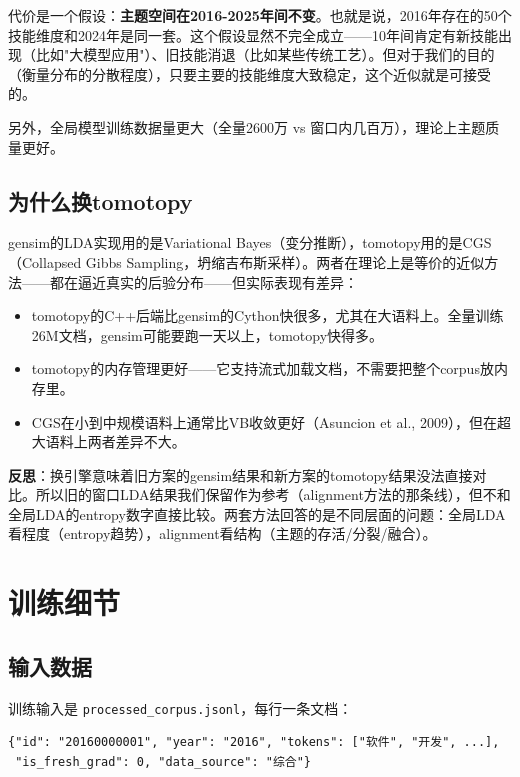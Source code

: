 \documentclass[12pt,a4paper]{ctexart}
\begin{document}
代价是一个假设：\textbf{主题空间在2016-2025年间不变}。也就是说，2016年存在的50个技能维度和2024年是同一套。这个假设显然不完全成立——10年间肯定有新技能出现（比如"大模型应用"）、旧技能消退（比如某些传统工艺）。但对于我们的目的（衡量分布的分散程度），只要主要的技能维度大致稳定，这个近似就是可接受的。

另外，全局模型训练数据量更大（全量2600万 vs 窗口内几百万），理论上主题质量更好。

\subsection{为什么换tomotopy}

gensim的LDA实现用的是Variational Bayes（变分推断），tomotopy用的是CGS（Collapsed Gibbs Sampling，坍缩吉布斯采样）。两者在理论上是等价的近似方法——都在逼近真实的后验分布——但实际表现有差异：

\begin{itemize}
\item tomotopy的C++后端比gensim的Cython快很多，尤其在大语料上。全量训练26M文档，gensim可能要跑一天以上，tomotopy快得多。
\item tomotopy的内存管理更好——它支持流式加载文档，不需要把整个corpus放内存里。
\item CGS在小到中规模语料上通常比VB收敛更好（Asuncion et al., 2009），但在超大语料上两者差异不大。
\end{itemize}

\textbf{反思}：换引擎意味着旧方案的gensim结果和新方案的tomotopy结果没法直接对比。所以旧的窗口LDA结果我们保留作为参考（alignment方法的那条线），但不和全局LDA的entropy数字直接比较。两套方法回答的是不同层面的问题：全局LDA看程度（entropy趋势），alignment看结构（主题的存活/分裂/融合）。


\section{训练细节}
\label{sec:training}

\subsection{输入数据}

训练输入是 \texttt{processed\_corpus.jsonl}，每行一条文档：

\begin{verbatim}
{"id": "20160000001", "year": "2016", "tokens": ["软件", "开发", ...],
 "is_fresh_grad": 0, "data_source": "综合"}
\end{verbatim}
\end{document}
